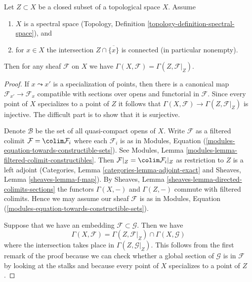 \begin{lemma}
\label{lemma-h0-topological}
Let $Z \subset X$ be a closed subset of a topological space $X$.
Assume
\begin{enumerate}
\item $X$ is a spectral space
(Topology, Definition \ref{topology-definition-spectral-space}), and
\item for $x \in X$ the intersection $Z \cap \overline{\{x\}}$
is connected (in particular nonempty).
\end{enumerate}
Then for any sheaf $\mathcal{F}$ on $X$ we have
$\Gamma(X, \mathcal{F}) = \Gamma(Z, \mathcal{F}|_Z)$.
\end{lemma}

\begin{proof}
If $x \leadsto x'$ is a specialization of points, then there is a
canonical map $\mathcal{F}_{x'} \to \mathcal{F}_x$ compatible with
sections over opens and functorial in $\mathcal{F}$. Since every point
of $X$ specializes to a point of $Z$ it follows that
$\Gamma(X, \mathcal{F}) \to \Gamma(Z, \mathcal{F}|_Z)$ is injective.
The difficult part is to show that it is surjective.

\medskip\noindent
Denote $\mathcal{B}$ be the set of all quasi-compact opens of $X$.
Write $\mathcal{F}$ as a filtered colimit $\mathcal{F} = \colim \mathcal{F}_i$
where each $\mathcal{F}_i$ is as in
Modules, Equation (\ref{modules-equation-towards-constructible-sets}).
See Modules, Lemma \ref{modules-lemma-filtered-colimit-constructibles}.
Then $\mathcal{F}|_Z = \colim \mathcal{F}_i|_Z$ as restriction to $Z$
is a left adjoint (Categories, Lemma \ref{categories-lemma-adjoint-exact} and
Sheaves, Lemma \ref{sheaves-lemma-f-map}).
By Sheaves, Lemma \ref{sheaves-lemma-directed-colimits-sections}
the functors $\Gamma(X, -)$ and $\Gamma(Z, -)$ commute with filtered colimits.
Hence we may assume our sheaf $\mathcal{F}$ is as in
Modules, Equation (\ref{modules-equation-towards-constructible-sets}).

\medskip\noindent
Suppose that we have an embedding $\mathcal{F} \subset \mathcal{G}$.
Then we have
$$
\Gamma(X, \mathcal{F}) =
\Gamma(Z, \mathcal{F}|_Z) \cap \Gamma(X, \mathcal{G})
$$
where the intersection takes place in $\Gamma(Z, \mathcal{G}|_Z)$.
This follows from the first remark of the proof because we can check
whether a global section of $\mathcal{G}$ is in $\mathcal{F}$ by looking
at the stalks and because every point of $X$ specializes to a point of $Z$.


\end{proof}
